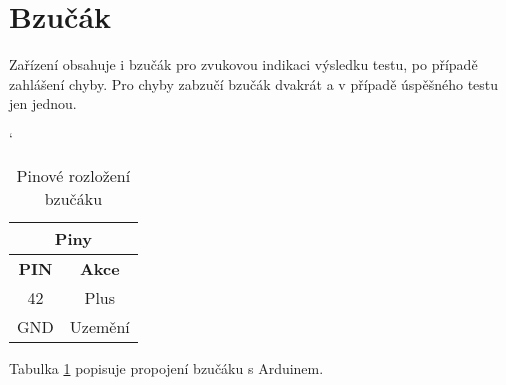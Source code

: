 
\section{Bzučák}
Zařízení obsahuje i bzučák pro zvukovou indikaci výsledku testu, po případě zahlášení chyby. Pro chyby zabzučí bzučák dvakrát a v případě úspěšného testu jen jednou.

\begin{table} [H]
	\caption{Pinové rozložení bzučáku}
	\label{table:pinSP}
	\centering
	\catcode` %
	\begin{tabular}[c]{|| c | c ||}
	\hline
		\multicolumn{2}{||c||}{Piny} \\
	\hline
 		 \textbf{PIN} & \textbf{Akce} \\
	\hline
		42 &  Plus \\
	\hline
		GND & Uzemění \\
	\hline
	\end{tabular}
\end{table}

Tabulka \ref{table:pinSP} popisuje propojení bzučáku s Arduinem.
